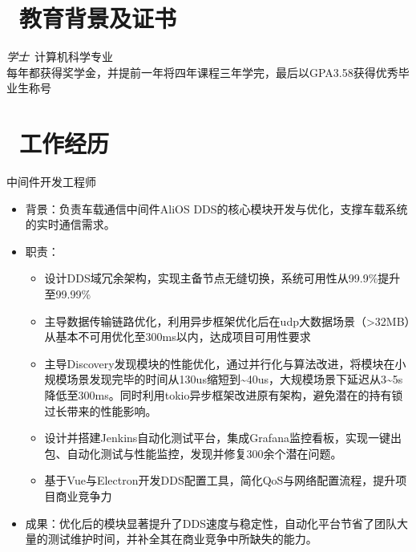 \documentclass{resume}
\begin{document}


 
\section{\faGraduationCap\  教育背景及证书}
\textit{学士}\ 计算机科学专业 \\
每年都获得奖学金，并提前一年将四年课程三年学完，最后以GPA3.58获得优秀毕业生称号


\section{\faUsers\ 工作经历}
 \begin{onehalfspacing}
中间件开发工程师
\begin{itemize}
  \item 背景：负责车载通信中间件AliOS DDS的核心模块开发与优化，支撑车载系统的实时通信需求。
  \item 职责：
    \begin{itemize}
      \item 设计DDS域冗余架构，实现主备节点无缝切换，系统可用性从99.9\%提升至99.99\%
      \item 主导数据传输链路优化，利用异步框架优化后在udp大数据场景（>32MB）从基本不可用优化至300ms以内，达成项目可用性要求
      \item 主导Discovery发现模块的性能优化，通过并行化与算法改进，将模块在小规模场景发现完毕的时间从130us缩短到\textasciitilde40us，大规模场景下延迟从3\textasciitilde5s降低至300ms。同时利用tokio异步框架改进原有架构，避免潜在的持有锁过长带来的性能影响。
      \item 设计并搭建Jenkins自动化测试平台，集成Grafana监控看板，实现一键出包、自动化测试与性能监控，发现并修复300余个潜在问题。
      \item 基于Vue与Electron开发DDS配置工具，简化QoS与网络配置流程，提升项目商业竞争力
    \end{itemize}
  \item 成果：优化后的模块显著提升了DDS速度与稳定性，自动化平台节省了团队大量的测试维护时间，并补全其在商业竞争中所缺失的能力。
\end{itemize}
 \end{onehalfspacing}
\end{document}
